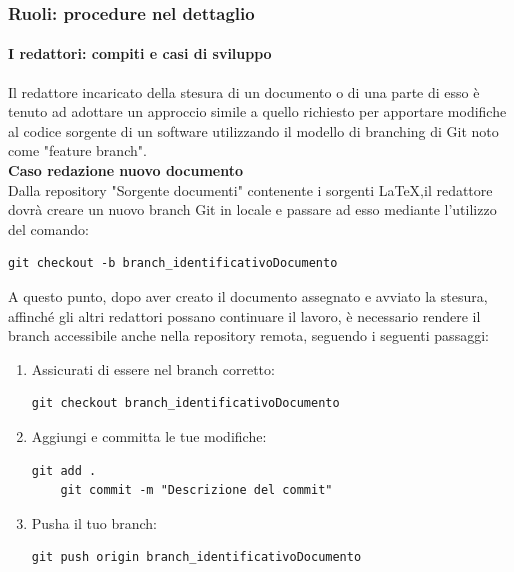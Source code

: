 \documentclass{article}
\begin{document}
    \subsubsection{Ruoli: procedure nel dettaglio}

    \paragraph{I redattori: compiti e casi di sviluppo}

    Il redattore incaricato della stesura di un documento o di una parte di esso è tenuto ad adottare un approccio simile a quello richiesto per apportare modifiche al codice sorgente di un software utilizzando il modello di branching di Git noto come "feature branch".\\
    \vspace{0.1cm}
    \textbf{Caso redazione nuovo documento}\\
Dalla repository  "Sorgente documenti" contenente i sorgenti \LaTeX,il redattore dovrà creare un nuovo branch Git in locale e passare ad esso mediante l'utilizzo del comando:

    \begin{lstlisting}[style=code]
    git checkout -b branch_identificativoDocumento 
    \end{lstlisting}

    A questo punto, dopo aver creato il documento assegnato e avviato la stesura, affinché gli altri redattori possano continuare il lavoro, è necessario rendere il branch accessibile anche nella repository remota, seguendo i seguenti passaggi:

    \begin{enumerate}
        \item Assicurati di essere nel branch corretto:
        \begin{lstlisting}[style=code]
    git checkout branch_identificativoDocumento 
        \end{lstlisting}

        \item Aggiungi e committa le tue modifiche:
        \begin{lstlisting}[style=code]
    git add .
    git commit -m "Descrizione del commit"
        \end{lstlisting}
        
        \item Pusha il tuo branch:
        \begin{lstlisting}[style=code]
    git push origin branch_identificativoDocumento
        \end{lstlisting}
    \end{enumerate}
\end{document}
